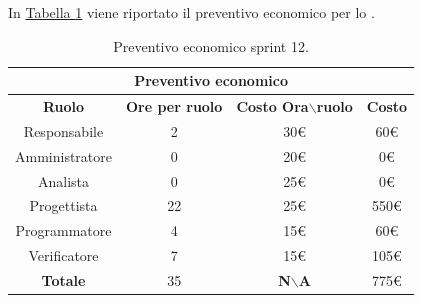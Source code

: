 In \hyperref[tab:sprint12_preventivo_economico]{Tabella \ref{tab:sprint12_preventivo_economico}} viene riportato il preventivo economico per lo .
\begin{table}[H]
    \centering
    \begin{tabular}{|c|c|c|c|}
        \hline
            \multicolumn{4}{|c|}{\textbf{Preventivo economico}} \\ 
        \hline
            \textbf{Ruolo} & \textbf{Ore per ruolo} & \textbf{Costo Ora$\backslash$ruolo} & \textbf{Costo} \\
        \hline
        Responsabile & 2 & 30€ & 60€ \\
        \hline
        Amministratore & 0 & 20€ & 0€ \\
        \hline
        Analista & 0 & 25€ & 0€ \\
        \hline
        Progettista & 22 & 25€ & 550€ \\
        \hline
        Programmatore & 4 & 15€ & 60€ \\
        \hline
        Verificatore & 7 & 15€ & 105€ \\
        \hline 
        \textbf{Totale} & 35 & \textbf{N$\backslash$A} & 775€  \\
        \hline
    \end{tabular}
    \caption{Preventivo economico sprint 12.}
    \label{tab:sprint12_preventivo_economico}
\end{table}